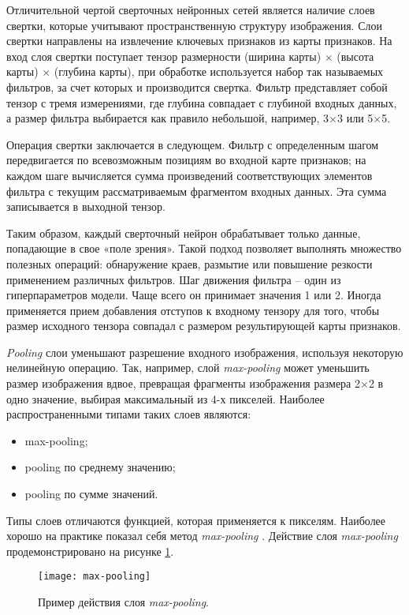 Отличительной чертой сверточных нейронных сетей является наличие слоев свертки, которые учитывают пространственную структуру изображения. Слои свертки направлены на извлечение ключевых признаков из карты признаков. На вход слоя свертки поступает тензор размерности (ширина карты) $\times$ (высота карты) $\times$ (глубина карты), при обработке используется набор так называемых фильтров, за счет которых и производится свертка. Фильтр представляет собой тензор с тремя измерениями, где глубина совпадает с глубиной входных данных, а размер фильтра выбирается как правило небольшой, например, 3$\times$3 или 5$\times$5.

Операция свертки заключается в следующем. Фильтр с определенным шагом передвигается по всевозможным позициям во входной карте признаков; на каждом шаге вычисляется сумма произведений соответствующих элементов фильтра с текущим рассматриваемым фрагментом входных данных. Эта сумма записывается в выходной тензор.

Таким образом, каждый сверточный нейрон обрабатывает только данные, попадающие в свое «поле зрения». Такой подход позволяет выполнять множество полезных операций: обнаружение краев, размытие или повышение резкости применением различных фильтров.
Шаг движения фильтра – один из гиперпараметров модели. Чаще всего он принимает значения 1 или 2.
Иногда применяется прием добавления отступов к входному тензору для того, чтобы размер исходного тензора совпадал с размером результирующей карты признаков.

\emph{Pooling} слои уменьшают разрешение входного изображения, используя некоторую нелинейную операцию. Так, например, слой \emph{max-pooling} может уменьшить размер изображения вдвое, превращая фрагменты изображения размера 2$\times$2 в одно значение, выбирая максимальный из 4-х пикселей. Наиболее распространенными типами таких слоев являются:
\begin{itemize}
	\item max-pooling;
	\item pooling по среднему значению;
	\item pooling по сумме значений.
\end{itemize}

Типы слоев отличаются функцией, которая применяется к пикселям. Наиболее хорошо на практике показал себя метод \emph{max-pooling} \cite{cnn-max-pooling}. Действие слоя \emph{max-pooling} продемонстрировано на рисунке \ref{fig:max-pooling}.
\begin{figure}[h]
	\centering
	\texttt{[image: max-pooling]}
	\caption{Пример действия слоя \emph{max-pooling}.}
	\label{fig:max-pooling}
\end{figure}

